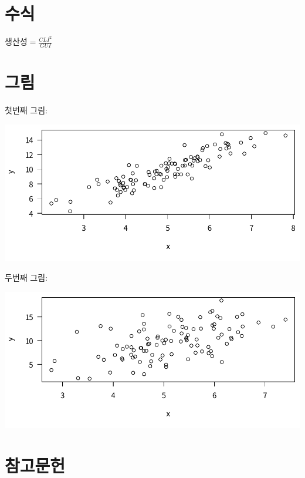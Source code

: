 \documentclass[12pt]{article}
\begin{document}
\section{수식}

$생산성 = \frac{CLI^2}{GUI}$

\section{그림}

첫번째 그림:

\centerline{\includegraphics[width=\textwidth]{fig/fig1.pdf}}

두번째 그림:

\centerline{\includegraphics[width=\textwidth]{fig/fig2.pdf}}

\section{참고문헌}

{}

\end{document}
